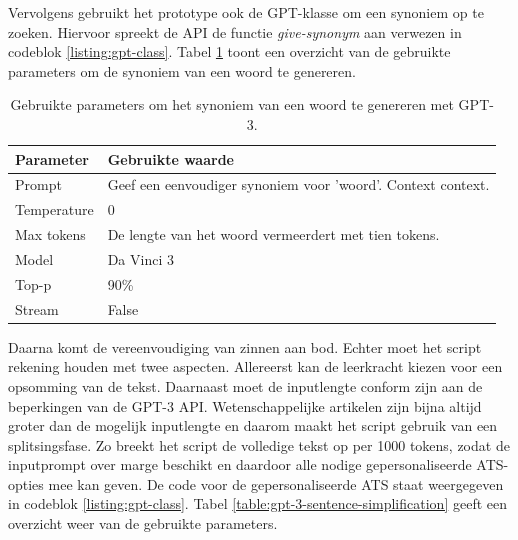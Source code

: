 \medspace

Vervolgens gebruikt het prototype ook de GPT-klasse om een synoniem op te zoeken. Hiervoor spreekt de API de functie \textit{give-synonym} aan verwezen in codeblok \ref{listing:gpt-class}. Tabel \ref{table:gpt-3-synonym} toont een overzicht van de gebruikte parameters om de synoniem van een woord te genereren.

\begin{center}
	\begin{table}[H]
		\begin{tabular}{| m{5cm}| m{8cm} |}
			\hline
			Parameter & Gebruikte waarde \\ \hline
			Prompt & Geef een eenvoudiger synoniem voor '{woord}'. Context {context}. \\ \hline
			Temperature & 0 \\ \hline
			Max tokens & De lengte van het woord vermeerdert met tien tokens. \\ \hline
			Model & Da Vinci 3 \\ \hline
			Top-p & 90\% \\ \hline
			Stream & False \\ \hline
		\end{tabular}
		\caption{Gebruikte parameters om het synoniem van een woord te genereren met GPT-3.}
		\label{table:gpt-3-synonym}
	\end{table}
\end{center}

\medspace

Daarna komt de vereenvoudiging van zinnen aan bod. Echter moet het script rekening houden met twee aspecten. Allereerst kan de leerkracht kiezen voor een opsomming van de tekst. Daarnaast moet de inputlengte conform zijn aan de beperkingen van de GPT-3 API. Wetenschappelijke artikelen zijn bijna altijd groter dan de mogelijk inputlengte en daarom maakt het script gebruik van een splitsingsfase. Zo breekt het script de volledige tekst op per 1000 tokens, zodat de inputprompt over marge beschikt en daardoor alle nodige gepersonaliseerde ATS-opties mee kan geven. De code voor de gepersonaliseerde ATS staat weergegeven in codeblok \ref{listing:gpt-class}. Tabel \ref{table:gpt-3-sentence-simplification} geeft een overzicht weer van de gebruikte parameters.

